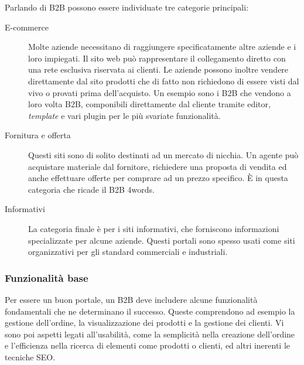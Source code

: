 Parlando di B2B possono essere individuate tre categorie principali:
\begin{description}
	\item[E-commerce] Molte aziende necessitano di raggiungere specificatamente altre aziende e i loro impiegati. Il sito web può rappresentare il collegamento diretto con una rete esclusiva riservata ai clienti. Le aziende possono inoltre vendere direttamente dal sito prodotti che di fatto non richiedono di essere visti dal vivo o provati prima dell'acquisto. Un esempio sono i B2B che vendono a loro volta B2B, componibili direttamente dal cliente tramite editor, \textit{template} e vari plugin per le più svariate funzionalità.
	
	\item[Fornitura e offerta] Questi siti sono di solito destinati ad un mercato di nicchia. Un agente può acquistare materiale dal fornitore, richiedere una proposta di vendita ed anche effettuare offerte per comprare ad un prezzo specifico. È in questa categoria che ricade il B2B 4words.
	
	\item[Informativi] La categoria finale è per i siti informativi, che forniscono informazioni specializzate per alcune aziende. Questi portali sono spesso usati come siti organizzativi per gli standard commerciali e industriali.
\end{description}

\subsubsection{Funzionalità base}
Per essere un buon portale, un B2B deve includere alcune funzionalità fondamentali che ne determinano il successo. Queste comprendono ad esempio la gestione dell'ordine, la visualizzazione dei prodotti e la gestione dei clienti. Vi sono poi aspetti legati all'usabilità, come la semplicità nella creazione dell'ordine e l'efficienza nella ricerca di elementi come prodotti o clienti, ed altri inerenti le tecniche SEO.

